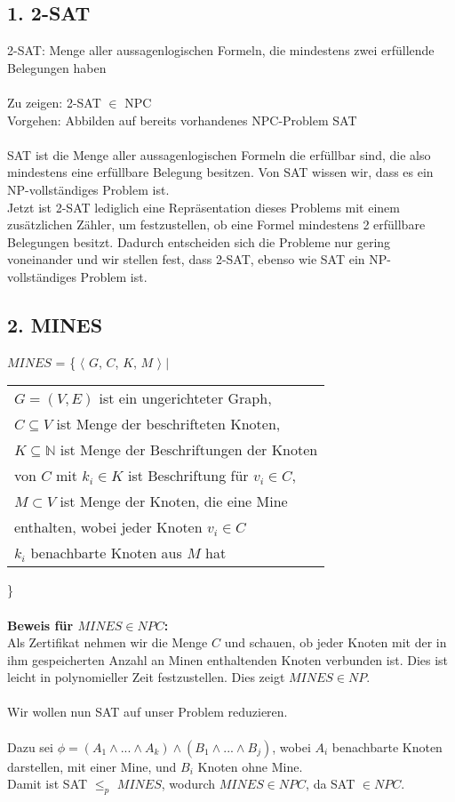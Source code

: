 \subsection*{1. 2-SAT}

2-SAT: Menge aller aussagenlogischen Formeln, die mindestens zwei erfüllende Belegungen haben \\\\
Zu zeigen: 2-SAT $\in$ NPC \\
Vorgehen: Abbilden auf bereits vorhandenes NPC-Problem SAT \\\\
SAT ist die Menge aller aussagenlogischen Formeln die erfüllbar sind, die also mindestens eine erfüllbare Belegung besitzen. Von SAT wissen wir, dass es ein NP-vollständiges Problem ist.\\
Jetzt ist 2-SAT lediglich eine Repräsentation dieses Problems mit einem zusätzlichen Zähler, um festzustellen, ob eine Formel mindestens 2 erfüllbare Belegungen besitzt. Dadurch entscheiden sich die Probleme nur gering voneinander und wir stellen fest, dass 2-SAT, ebenso wie SAT ein NP-vollständiges Problem ist.

\subsection*{2. MINES}
$MINES$ = \{ $\langle$ $G$, $C$, $K$, $M$ $\rangle \mid$
\begin{tabular}{l}
$G = (V,E)$ ist ein ungerichteter Graph,\\
$C \subseteq V$ ist Menge der beschrifteten Knoten,\\
$K \subseteq \mathbb{N}$ ist Menge der Beschriftungen der Knoten\\
von $C$ mit $k_i \in K$ ist Beschriftung für $v_i \in C$,\\
$M \subset V$ ist Menge der Knoten, die eine Mine\\
enthalten, wobei jeder Knoten $v_i \in C$\\
$k_i$ benachbarte Knoten aus $M$ hat
\end{tabular}\}\\\\
\textbf{Beweis für $MINES \in NPC$:}\\
Als Zertifikat nehmen wir die Menge $C$ und schauen, ob jeder Knoten mit der in ihm gespeicherten Anzahl an Minen enthaltenden Knoten verbunden ist. Dies ist leicht in polynomieller Zeit festzustellen. Dies zeigt $MINES \in NP$.\\\\
Wir wollen nun SAT auf unser Problem reduzieren.\\\\
Dazu sei $\phi = (A_1 \land ... \land A_k) \land (B_1 \land ... \land B_j)$, wobei $A_i$ benachbarte Knoten darstellen, mit einer Mine, und $B_i$ Knoten ohne Mine.\\
Damit ist SAT $\leq_p$ $MINES$, wodurch $MINES \in NPC$, da SAT $\in NPC$.